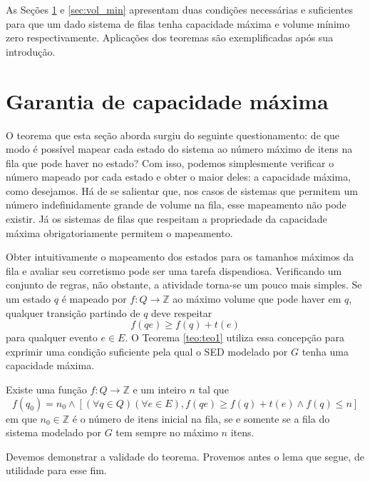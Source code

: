 As Seções \ref{sec:capac_max} e \ref{sec:vol_min} apresentam duas condições necessárias e suficientes para que um dado sistema de filas tenha capacidade máxima e volume mínimo zero respectivamente. Aplicações dos teoremas são exemplificadas após sua introdução.

\section{Garantia de capacidade máxima}
\label{sec:capac_max}

O teorema que esta seção aborda surgiu do seguinte questionamento: de que modo é possível mapear cada estado do sistema ao número máximo de itens na fila que pode haver no estado? Com isso, podemos simplesmente verificar o número mapeado por cada estado e obter o maior deles: a capacidade máxima, como desejamos. Há de se salientar que, nos casos de sistemas que permitem um número indefinidamente grande de volume na fila, esse mapeamento não pode existir. Já os sistemas de filas que respeitam a propriedade da capacidade máxima obrigatoriamente permitem o mapeamento.

Obter intuitivamente o mapeamento dos estados para os tamanhos máximos da fila e avaliar seu corretismo pode ser uma tarefa dispendiosa. Verificando um conjunto de regras, não obstante, a atividade torna-se um pouco mais simples. Se um estado $q$ é mapeado por $f : Q \to \mathbb{Z}$ ao máximo volume que pode haver em $q$, qualquer transição partindo de $q$ deve respeitar $$f(qe) \geq f(q) + t(e)$$ para qualquer evento $e \in E$. O Teorema \ref{teo:teo1} utiliza essa concepção para exprimir uma condição suficiente pela qual o SED modelado por $G$ tenha uma capacidade máxima.

\begin{teo}
	\label{teo:teo1}
	Existe uma função $f : Q \to \mathbb{Z}$ e um inteiro $n$ tal que \begin{equation*}
	f(q_0) = n_0 \wedge [(\forall q \in Q)(\forall e \in E), f(qe) \geq f(q) + t(e) \wedge f(q) \leq n]
	\end{equation*} em que $n_0 \in \mathbb{Z}$ é o número de itens inicial na fila, se e somente se a fila do sistema modelado por $G$ tem sempre no máximo $n$ itens.
\end{teo}

Devemos demonstrar a validade do teorema. Provemos antes o lema que segue, de utilidade para esse fim.


